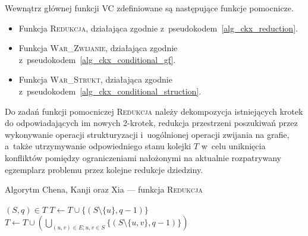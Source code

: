 {  Wewnątrz głównej funkcji \textsc{VC} zdefiniowane są następujące funkcje pomocnicze.
  \begin{itemize}
    \item Funkcja \textsc{Redukcja}, działająca zgodnie z~pseudokodem~\ref{alg_ckx_reduction}.
    \item Funkcja \textsc{War\_Zwijanie}, działająca zgodnie z~pseudokodem~\ref{alg_ckx_conditional_gf}.
    \item Funkcja \textsc{War\_Strukt}, działająca zgodnie z~pseudokodem~\ref{alg_ckx_conditional_struction}.
  \end{itemize}

  Do zadań funkcji pomocniczej \textsc{Redukcja} należy dekompozycja istniejących krotek do odpowiadających im nowych 2-krotek, redukcja przestrzeni poszukiwań przez wykonywanie operacji strukturyzacji i~uogólnionej operacji zwijania na grafie, a~także utrzymywanie odpowiedniego stanu kolejki $T$ w~celu uniknięcia konfliktów pomiędzy ograniczeniami nałożonymi na aktualnie rozpatrywany egzemplarz problemu przez kolejne redukcje dziedziny.

  \begin{algorithm}
   \caption{Algorytm Chena, Kanji oraz Xia --- funkcja \textsc{Redukcja}}\label{alg_ckx_reduction}
   \begin{algorithmic}[1]
      \ForAll$(S, q) \in T$
        \EndIf
          \State$T \gets T \cup \{(S \setminus \{u\}, q-1)\}$\label{a2}
        \EndFor
          \State$T \gets T \cup (\bigcup_{(u, v) \in E; u,v \in S}\{(S \setminus \{u, v\}, q-1)\})$\label{a3}
        \EndIf
        \label{a4}
        \EndIf
      \EndFor
      \label{b}
        \State{}
      \EndIf
      \EndIf
    \EndFunction
   \end{algorithmic}
  \end{algorithm}

}
